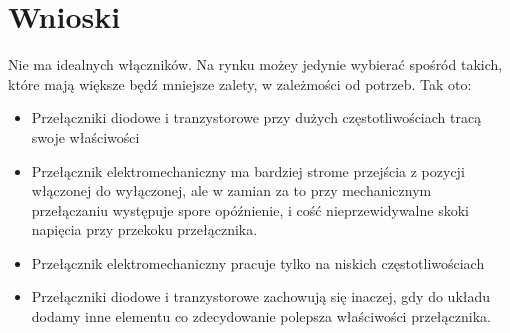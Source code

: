 \documentclass[a4paper,11pt]{article}
\begin{document}
\section{Wnioski}

Nie ma idealnych włączników. Na rynku możey jedynie wybierać spośród takich, które mają większe będź mniejsze zalety, w zależmości od potrzeb. Tak oto: 
\begin{itemize}
  \item Przełączniki diodowe i tranzystorowe przy dużych częstotliwościach tracą swoje właściwości 
  \item Przełącznik elektromechaniczny ma bardziej strome przejścia z pozycji włączonej do wyłączonej, ale w zamian za to przy mechanicznym przełączaniu występuje spore  opóźnienie, i cość nieprzewidywalne skoki napięcia przy przekoku przełącznika. 
  \item Przełącznik elektromechaniczny pracuje tylko na niskich częstotliwościach 
  \item Przełączniki diodowe i tranzystorowe zachowują się inaczej, gdy do układu dodamy inne elementu co zdecydowanie polepsza właściwości przełącznika. 
\end{itemize}
\end{document}
